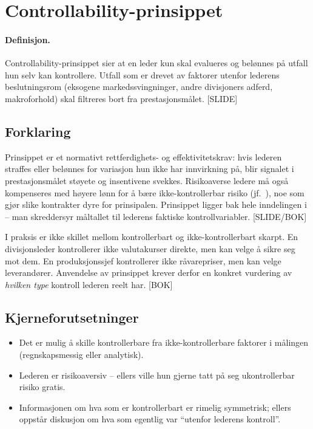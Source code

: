 \section{Controllability-prinsippet}\label{thr:controllability-principle}

\paragraph{Definisjon.} Controllability-prinsippet sier at en leder kun skal evalueres og belønnes på utfall hun selv kan kontrollere. Utfall som er drevet av faktorer utenfor lederens beslutningsrom (eksogene markedssvingninger, andre divisjoners adferd, makroforhold) skal filtreres bort fra prestasjonsmålet. [SLIDE]

\subsection*{Forklaring}

Prinsippet er et normativt rettferdighets- og effektivitetskrav: hvis lederen straffes eller belønnes for variasjon hun ikke har innvirkning på, blir signalet i prestasjonsmålet støyete og insentivene svekkes. Risikoaverse ledere må også kompenseres med høyere lønn for å bære ikke-kontrollerbar risiko (jf.\ ), noe som gjør slike kontrakter dyre for prinsipalen. Prinsippet ligger bak hele inndelingen i  -- man skreddersyr måltallet til lederens faktiske kontrollvariabler. [SLIDE/BOK]

I praksis er ikke skillet mellom kontrollerbart og ikke-kontrollerbart skarpt. En divisjonsleder kontrollerer ikke valutakurser direkte, men kan velge å sikre seg mot dem. En produksjonssjef kontrollerer ikke råvarepriser, men kan velge leverandører. Anvendelse av prinsippet krever derfor en konkret vurdering av \emph{hvilken type} kontroll lederen reelt har. [BOK]

\subsection*{Kjerneforutsetninger}
\begin{itemize}
\item Det er mulig å skille kontrollerbare fra ikke-kontrollerbare faktorer i målingen (regnskapsmessig eller analytisk).
\item Lederen er risikoaversiv -- ellers ville hun gjerne tatt på seg ukontrollerbar risiko gratis.
\item Informasjonen om hva som er kontrollerbart er rimelig symmetrisk; ellers oppstår diskusjon om hva som egentlig var ``utenfor lederens kontroll''.
\end{itemize}

